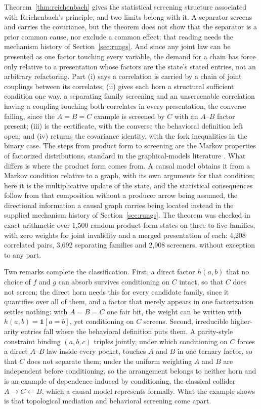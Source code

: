 \documentclass[11pt]{article}
\begin{document}
\noindent Theorem~\ref{thm:reichenbach} gives the statistical screening structure associated with Reichenbach's principle, and two limits belong with it. A separator screens and carries the covariance, but the theorem does not show that the separator is a prior common cause, nor exclude a common effect; that reading needs the mechanism history of Section~\ref{sec:rungs}. And since any joint law can be presented as one factor touching every variable, the demand for a chain has force only relative to a presentation whose factors are the state's stated entries, not an arbitrary refactoring. Part (i) says a correlation is carried by a chain of joint couplings between its correlates; (ii) gives each horn a structural sufficient condition one way, a separating family screening and an unscreenable correlation having a coupling touching both correlates in every presentation, the converse failing, since the $A = B = C$ example is screened by $C$ with an $A$--$B$ factor present; (iii) is the certificate, with the converse the behavioral definition left open; and (iv) returns the covariance identity, with the fork inequalities in the binary case. The steps from product form to screening are the Markov properties of factorized distributions, standard in the graphical-models literature \cite{lauritzen1996graphical}. What differs is where the product form comes from. A causal model obtains it from a Markov condition relative to a graph, with its own arguments for that condition; here it is the multiplicative update of the state, and the statistical consequences follow from that composition without a producer arrow being assumed, the directional information a causal graph carries being located instead in the supplied mechanism history of Section~\ref{sec:rungs}. The theorem was checked in exact arithmetic over 1{,}500 random product-form states on three to five families, with zero weights for joint invalidity and a merged presentation of each: 4{,}208 correlated pairs, 3{,}692 separating families and 2{,}908 screeners, without exception to any part.

Two remarks complete the classification. First, a direct factor $h(a,b)$ that no choice of $f$ and $g$ can absorb survives conditioning on $C$ intact, so that $C$ does not screen; the direct horn needs this for every candidate family, since it quantifies over all of them, and a factor that merely appears in one factorization settles nothing: with $A = B = C$ one fair bit, the weight can be written with $h(a,b) = \mathbf{1}[a = b]$, yet conditioning on $C$ screens. Second, irreducible higher-arity entries fall where the behavioral definition puts them. A parity-style constraint binding $(a,b,c)$ triples jointly, under which conditioning on $C$ forces a direct $A$--$B$ law inside every pocket, touches $A$ and $B$ in one ternary factor, so that $C$ does not separate them; under the uniform weighting $A$ and $B$ are independent before conditioning, so the arrangement belongs to neither horn and is an example of dependence induced by conditioning, the classical collider $A \to C \leftarrow B$, which a causal model represents formally. What the example shows is that topological mediation and behavioral screening come apart.
\end{document}
